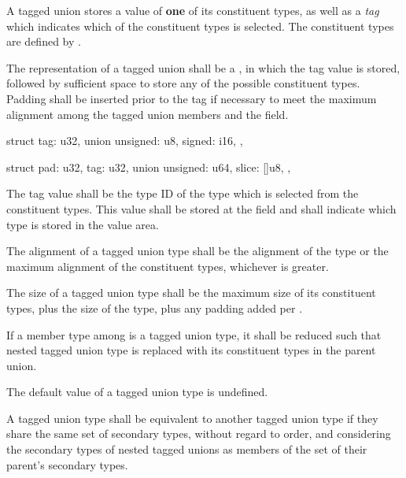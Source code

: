 \specsubsubitem
A tagged union stores a value of \textbf{one} of its constituent types, as well
as a \textit{tag} which indicates which of the constituent types is selected.
The constituent types are defined by .

\specsubsubitem
The representation of a tagged union shall be a , in which the
tag value is stored, followed by sufficient space to store any of the possible
constituent types. Padding shall be inserted prior to the tag if necessary to
meet the maximum alignment among the tagged union members and the 
field.


\begin{codesample}
struct {
	tag: u32,
	union {
		unsigned: u8,
		signed: i16,
	},
}
\end{codesample}
\begin{codesample}
struct {
	pad: u32,
	tag: u32,
	union {
		unsigned: u64,
		slice: []u8,
	},
}
\end{codesample}

\specsubsubitem
The tag value shall be the type ID of the type which is selected from the
constituent types. This value shall be stored at the  field and
shall indicate which type is stored in the value area.

\specsubsubitem
The alignment of a tagged union type shall be the alignment of the
 type or the maximum alignment of the constituent types,
whichever is greater.

\specsubsubitem
The size of a tagged union type shall be the maximum size of its constituent
types, plus the size of the  type, plus any padding added per
.

\specsubsubitem
If a member type among  is a tagged union type, it
shall be reduced such that nested tagged union type is replaced with its
constituent types in the parent union.


\specsubsubitem
The default value of a tagged union type is undefined.

\specsubsubitem
A tagged union type shall be equivalent to another tagged union type if they
share the same set of secondary types, without regard to order, and considering
the secondary types of nested tagged unions as members of the set of their
parent's secondary types.

